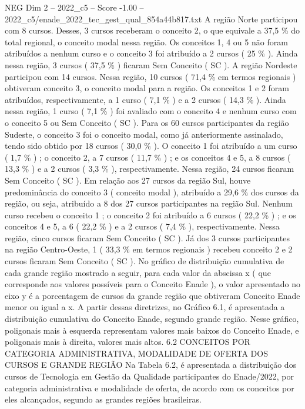\begin{textsample}{NEG Dim 2 – 2022\_c5 – Score -1.00 – 2022\_c5/enade\_2022\_tec\_gest\_qual\_854a44b817.txt}
A região Norte participou com 8 cursos.
Desses, 3 cursos receberam o conceito 2, o que equivale a 37,5 \% do total regional, o conceito modal nessa região.
Os conceitos 1, 4 ou 5 não foram atribuídos a nenhum curso e o conceito 3 foi atribuído a 2 cursos ( 25 \% ).
Ainda nessa região, 3 cursos ( 37,5 \% ) ficaram Sem Conceito ( SC ).
A região Nordeste participou com 14 cursos.
Nessa região, 10 cursos ( 71,4 \% em termos regionais ) obtiveram conceito 3, o conceito modal para a região.
Os conceitos 1 e 2 foram atribuídos, respectivamente, a 1 curso ( 7,1 \% ) e a 2 cursos ( 14,3 \% ).
Ainda nessa região, 1 curso ( 7,1 \% ) foi avaliado com o conceito 4 e nenhum curso com o conceito 5 ou Sem Conceito ( SC ).
Para os 60 cursos participantes da região Sudeste, o conceito 3 foi o conceito modal, como já anteriormente assinalado, tendo sido obtido por 18 cursos ( 30,0 \% ).
O conceito 1 foi atribuído a um curso ( 1,7 \% ) ; o conceito 2, a 7 cursos ( 11,7 \% ) ; e os conceitos 4 e 5, a 8 cursos ( 13,3 \% ) e a 2 cursos ( 3,3 \% ), respectivamente.
Nessa região, 24 cursos ficaram Sem Conceito ( SC ).
Em relação aos 27 cursos da região Sul, houve predominância do conceito 3 ( conceito modal ), atribuído a 29,6 \% dos cursos da região, ou seja, atribuído a 8 dos 27 cursos participantes na região Sul.
Nenhum curso recebeu o conceito 1 ; o conceito 2 foi atribuído a 6 cursos ( 22,2 \% ) ; e os conceitos 4 e 5, a 6 ( 22,2 \% ) e a 2 cursos ( 7,4 \% ), respectivamente.
Nessa região, cinco cursos ficaram Sem Conceito ( SC ).
Já dos 3 cursos participantes na região Centro-Oeste, 1 ( 33,3 \% em termos regionais ) recebeu conceito 2 e 2 cursos ficaram Sem Conceito ( SC ).
No gráfico de distribuição cumulativa de cada grande região mostrado a seguir, para cada valor da abscissa x ( que corresponde aos valores possíveis para o Conceito Enade ), o valor apresentado no eixo y é a porcentagem de cursos da grande região que obtiveram Conceito Enade menor ou igual a x.
A partir dessas diretrizes, no Gráfico 6.1, é apresentada a distribuição cumulativa do Conceito Enade, segundo grande região.
Nesse gráfico, poligonais mais à esquerda representam valores mais baixos do Conceito Enade, e poligonais mais à direita, valores mais altos. 6.2 CONCEITOS POR CATEGORIA ADMINISTRATIVA, MODALIDADE DE OFERTA DOS CURSOS E GRANDE REGIÃO Na Tabela 6.2, é apresentada a distribuição dos cursos de Tecnologia em Gestão da Qualidade participantes do Enade/2022, por categoria administrativa e modalidade de oferta, de acordo com os conceitos por eles alcançados, segundo as grandes regiões brasileiras.

\end{textsample}
